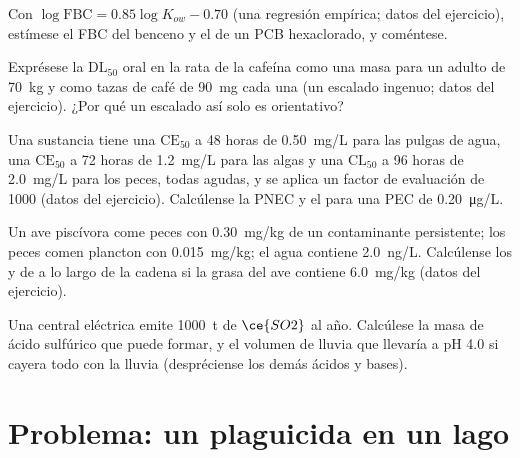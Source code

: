 \begin{exercise}[$\star\star$]\label{exo:b3:environmental-toxicology:8}
Con $\log\mathrm{FBC} = 0.85\log K_{ow} - 0.70$ (una regresión empírica; datos del ejercicio), estímese el FBC del
benceno y el de un PCB hexaclorado, y coméntese.
\end{exercise}

\begin{exercise}[$\star\star$]\label{exo:b3:environmental-toxicology:9}
Exprésese la $\mathrm{DL_{50}}$ oral en la rata de la cafeína como una masa para un adulto de \qty{70}{kg} y como tazas de café de
\qty{90}{mg} cada una (un escalado ingenuo; datos del ejercicio). ¿Por qué un escalado así solo es orientativo?
\end{exercise}

\begin{exercise}[$\star\star\star$]\label{exo:b3:environmental-toxicology:10}
Una sustancia tiene una $\mathrm{CE_{50}}$ a 48 horas de \qty{0.50}{mg/L} para las pulgas de agua, una $\mathrm{CE_{50}}$ a 72 horas de \qty{1.2}{mg/L} para las algas
y una $\mathrm{CL_{50}}$ a 96 horas de \qty{2.0}{mg/L} para los peces, todas agudas, y se aplica un factor de evaluación de 1000
(datos del ejercicio). Calcúlense la PNEC y el  para una PEC de \qty{0.20}{\micro g/L}.
\end{exercise}

\begin{exercise}[$\star\star\star$]\label{exo:b3:environmental-toxicology:11}
Un ave piscívora come peces con \qty{0.30}{mg/kg} de un contaminante persistente; los peces comen
plancton con \qty{0.015}{mg/kg}; el agua contiene \qty{2.0}{ng/L}. Calcúlense los  y de
 a lo largo de la cadena si la grasa del ave contiene \qty{6.0}{mg/kg} (datos del
ejercicio).
\end{exercise}

\begin{exercise}[$\star\star\star$]\label{exo:b3:environmental-toxicology:12}
Una central eléctrica emite \qty{1000}{t} de $\ce{SO2}$ al año. Calcúlese la masa de ácido sulfúrico que puede formar,
y el volumen de lluvia que llevaría a pH 4.0 si cayera todo con la lluvia (despréciense los demás
ácidos y bases).
\end{exercise}

\section{Problema: un plaguicida en un lago}

